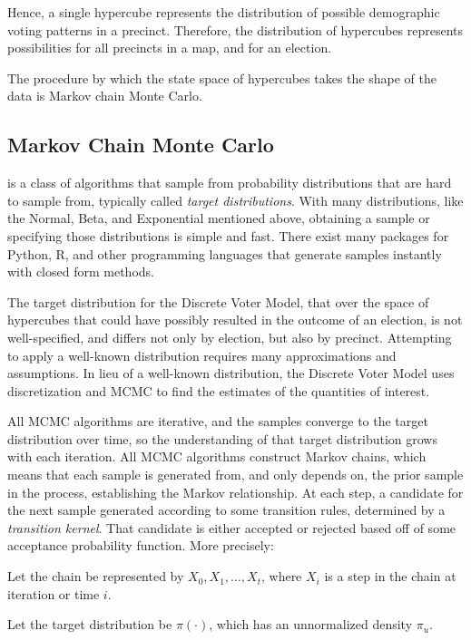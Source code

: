 Hence, a single hypercube represents the distribution of possible demographic voting patterns in a precinct. Therefore, the distribution of hypercubes represents possibilities for all precincts in a map, and for an election.

The procedure by which the state space of hypercubes takes the shape of the data is Markov chain Monte Carlo.


\subsection{Markov Chain Monte Carlo}

 is a class of algorithms that sample from probability distributions that are hard to sample from, typically called \emph{target distributions}.\cite{mcmc_history} With many distributions, like the Normal, Beta, and Exponential mentioned above, obtaining a sample or specifying those distributions is simple and fast. There exist many packages for Python, R, and other programming languages that generate samples instantly with closed form methods.

The target distribution for the Discrete Voter Model, that over the space of hypercubes that could have possibly resulted in the outcome of an election, is not well-specified, and differs not only by election, but also by precinct. Attempting to apply a well-known distribution requires many approximations and assumptions. In lieu of a well-known distribution, the Discrete Voter Model uses discretization and MCMC to find the estimates of the quantities of interest.

All MCMC algorithms are iterative, and the samples converge to the target distribution over time, so the understanding of that target distribution grows with each iteration. All MCMC algorithms construct Markov chains, which means that each sample is generated from, and only depends on, the prior sample in the process, establishing the Markov relationship.\cite{mcmc_methods} At each step, a candidate for the next sample generated according to some transition rules, determined by a \textit{transition kernel}. That candidate is either accepted or rejected based off of some acceptance probability function. More precisely:

Let the chain be represented by ${X_0, X_1, \dots, X_t}$, where $X_i$ is a step in the chain at iteration or time $i$.

Let the target distribution be $\pi(\cdot)$, which has an unnormalized density $\pi_u$.

